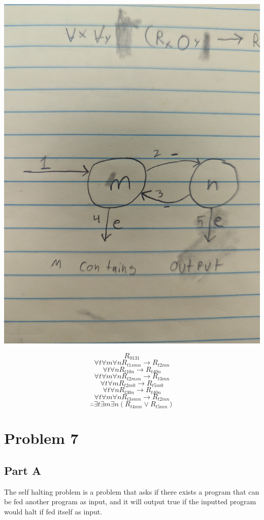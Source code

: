 \documentclass[12pt]{article}
\begin{document}
\includegraphics[width=\textwidth]{6}

\[ R_{0131} \]
\[ \forall t \forall m \forall n R_{t1smn} \rightarrow R_{t2mn} \]
\[ \forall t \forall n R_{t10n} \rightarrow R_{t40n} \]
\[ \forall t \forall m \forall n R_{t2msn} \rightarrow R_{t3mn} \]
\[ \forall t \forall m R_{t2m0} \rightarrow R_{t5m0} \]
\[ \forall t \forall n R_{t30n} \rightarrow R_{t40n} \]
\[ \forall t \forall m \forall n R_{t3smn} \rightarrow R_{t2mn} \]
\[ \therefore \exists t \exists m \exists n (R_{t4mn} \lor R_{t5mn}) \]

\section*{Problem 7}


\subsection*{Part A}
The self halting problem is a problem that asks if there exists a program that can be fed another program as input, and it will output true if the inputted program would halt if fed itself as input. 
\end{document}
